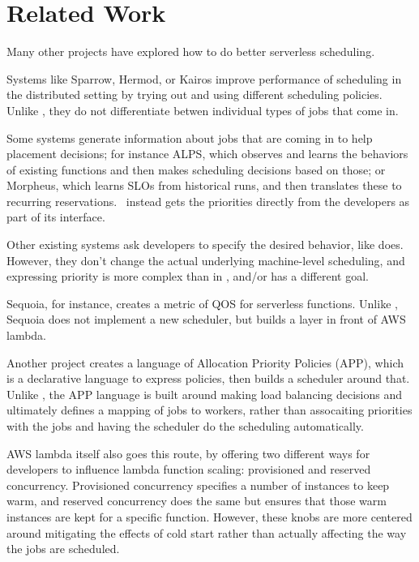 \section{Related Work}

Many other projects have explored how to do better serverless scheduling.
 
Systems like Sparrow\cite{TODO}, Hermod\cite{TODO}, or Kairos\cite{TODO} improve
performance of scheduling in the distributed setting by trying out and using
different scheduling policies. Unlike \sys{}, they do not differentiate betwen
individual types of jobs that come in.


Some systems generate information about jobs that are coming in to help
placement decisions; for instance ALPS\cite{TODO}, which observes and learns the
behaviors of existing functions and then makes scheduling decisions based on
those; or Morpheus\cite{TODO}, which learns SLOs from historical runs, and then
translates these to recurring reservations.\ \sys{} instead gets the priorities
directly from the developers as part of its interface.


Other existing systems ask developers to specify the desired behavior, like
\sys{} does. However, they don't change the actual underlying machine-level
scheduling, and expressing priority is more complex than in \sys{}, and/or has a
different goal.

Sequoia\cite{TODO}, for instance, creates a metric of QOS for serverless
functions. Unlike \sys{}, Sequoia does not implement a new scheduler, but builds
a layer in front of AWS lambda. 

Another project\cite{TODO} creates a language of Allocation Priority Policies
(APP), which is a declarative language to express policies, then builds a
scheduler around that. Unlike \sys{}, the APP language is built around making
load balancing decisions and ultimately defines a mapping of jobs to workers,
rather than assocaiting priorities with the jobs and having the scheduler do the
scheduling automatically.

AWS lambda itself also goes this route, by offering two different ways for
developers to influence lambda function scaling: provisioned and reserved
concurrency\cite{TODO}. Provisioned concurrency specifies a number of instances
to keep warm, and reserved concurrency does the same but ensures that those warm
instances are kept for a specific function. However, these knobs are more
centered around mitigating the effects of cold start rather than actually
affecting the way the  jobs are scheduled.
